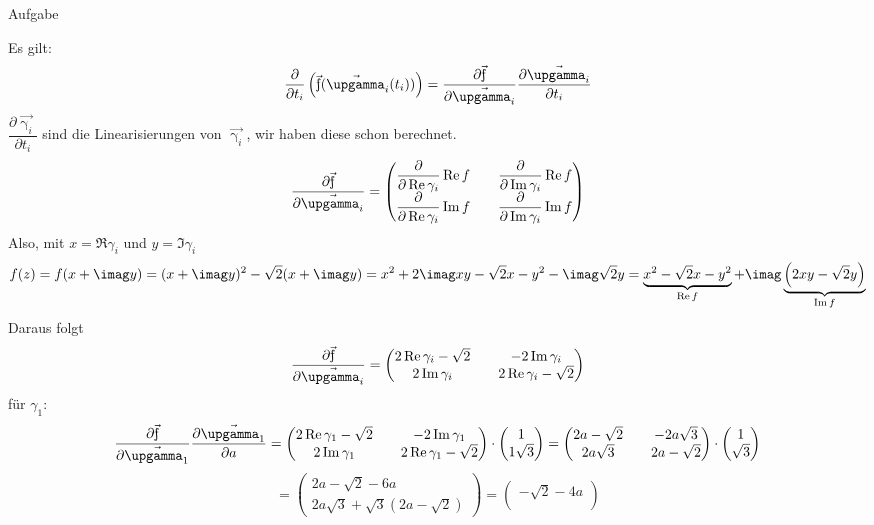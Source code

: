 \documentclass{scrartcl}
\begin{document}
\begin{section}{Aufgabe}
\begin{itemize}
Es gilt: \[\frac{\partial}{\partial t_i}\left(\f(\vec{\upgamma}_i(t_i))\right)=\dfrac{\partial \f}{\partial \vec{\upgamma_i}}\dfrac{\partial \vec{\upgamma_i}}{\partial t_i}\]
\(\dfrac{\partial \vec{\upgamma_i}}{\partial t_i}\) sind die Linearisierungen von $\vec{\upgamma_i}$, wir haben diese schon berechnet.
\[\dfrac{\partial \f}{\partial \vec{\upgamma_i}}=
\begin{pmatrix}
    \dfrac{\partial}{\partial \Re \gamma_i}\Re f&& \dfrac{\partial}{\partial \Im \gamma_i}\Re f\\
    \dfrac{\partial}{\partial \Re \gamma_i}\Im f&& \dfrac{\partial}{\partial \Im \gamma_i}\Im f
\end{pmatrix}\]
Also, mit \(x=\Re \gamma_i\) und \(y=\Im \gamma_i\)
\[f(z)=f(x+\imag y)
=(x+\imag y)^2-\sqrt{2} (x+\imag y)
=x^2+2 \imag x y-\sqrt{2} x-y^2-\imag \sqrt{2} y
=\underbrace{x^2-\sqrt{2} x-y^2}_{\Re f}
+\imag\underbrace{\left(2 x y-\sqrt{2} y\right)}_{\Im f}\]
Daraus folgt\[\frac{\partial \f}{\partial \vec{\upgamma_i}}=
\begin{pmatrix}
    2\Re \gamma_i -\sqrt{2}&& -2\Im \gamma_i\\
    2\Im \gamma_i&& 2\Re \gamma_i -\sqrt{2}
\end{pmatrix}\]
für \(\gamma_1\):
\newcommand{\pfa}{\frac{\partial \f}{\partial \vec{\upgamma_1}}\frac{\partial \vec{\upgamma_1}}{\partial a}}
\newcommand{\pfb}{\frac{\partial \f}{\partial \vec{\upgamma_2}}\frac{\partial \vec{\upgamma_2}}{\partial b}}
\[\pfa=
\begin{pmatrix}
    2\Re \gamma_1 -\sqrt{2}&& -2\Im \gamma_1\\
    2\Im \gamma_1&& 2\Re \gamma_1 -\sqrt{2}
\end{pmatrix}
\cdot\begin{pmatrix}1\\1\sqrt{3}\end{pmatrix}
=
\begin{pmatrix}
    2a -\sqrt{2}&& -2a\sqrt{3}\\
    2a\sqrt{3}&& 2a -\sqrt{2}
\end{pmatrix}
\cdot\begin{pmatrix}1\\\sqrt{3}\end{pmatrix}
\]
\[=\begin{pmatrix}
    2a-\sqrt{2}-6a\\
    2a\sqrt{3}+\sqrt{3}(2a -\sqrt{2})
\end{pmatrix}
=\begin{pmatrix}
    -\sqrt{2}-4a\\

\end{pmatrix}\]
\end{itemize}
\end{section}
\end{document}
